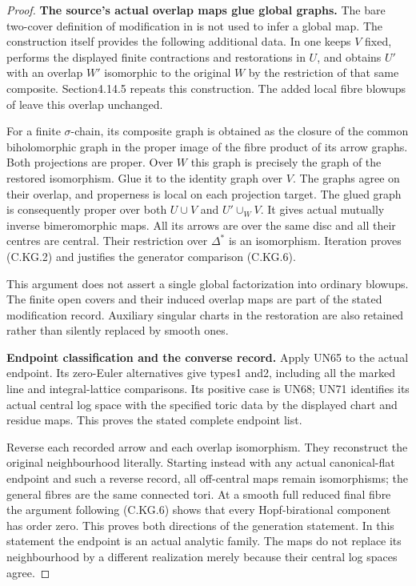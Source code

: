\begin{proof}
\par\medskip\noindent\textbf{The source's actual overlap maps glue global graphs.}
The bare two-cover definition of modification
in \cite[\S2]{Kulikov1981} is not used to
infer a global map. The construction itself
provides the following additional data.
In \cite[\S4.10.8, pp.980--982]{Kulikov1977}
one keeps $V$ fixed, performs the displayed
finite contractions and restorations in
$U$, and obtains $U'$ with an overlap
$W'$ isomorphic to the original $W$ by
the restriction of that same composite.
Section4.14.5 repeats this construction.
The added local fibre blowups of
\cite[\S8]{Kulikov1981} leave this overlap
unchanged.

For a finite $\sigma$-chain, its composite
graph is obtained as the closure of the
common biholomorphic graph in the proper
image of the fibre product of its arrow
graphs. Both projections are proper.
Over $W$ this graph is precisely the
graph of the restored isomorphism.
Glue it to the identity graph over $V$.
The graphs agree on their overlap, and
properness is local on each projection
target. The glued graph is consequently
proper over both $U\cup V$ and
$U'\cup_W V$. It gives actual mutually
inverse bimeromorphic maps. All its arrows
are over the same disc and all their
centres are central. Their restriction
over $\Delta^*$ is an isomorphism.
Iteration proves (C.KG.2) and justifies
the generator comparison (C.KG.6).

This argument does not assert a single
global factorization into ordinary
blowups. The finite open covers and
their induced overlap maps are part
of the stated modification record.
Auxiliary singular charts in the
restoration are also retained rather
than silently replaced by smooth ones.

\par\medskip\noindent\textbf{Endpoint classification and the converse record.}
Apply UN65 to the actual endpoint.
Its zero-Euler alternatives give types1
and2, including all the marked line
and integral-lattice comparisons.
Its positive case is UN68; UN71
identifies its actual central log
space with the specified toric data
by the displayed chart and residue
maps. This proves the stated complete
endpoint list.

Reverse each recorded arrow and each
overlap isomorphism. They reconstruct
the original neighbourhood literally.
Starting instead with any actual
canonical-flat endpoint and such a
reverse record, all off-central maps
remain isomorphisms; the general
fibres are the same connected tori.
At a smooth full reduced final fibre
the argument following (C.KG.6) shows
that every Hopf-birational component
has order zero. This proves both
directions of the generation statement.
In this statement the endpoint is an
actual analytic family. The maps do
not replace its neighbourhood by a
different realization merely because
their central log spaces agree.


\end{proof}

